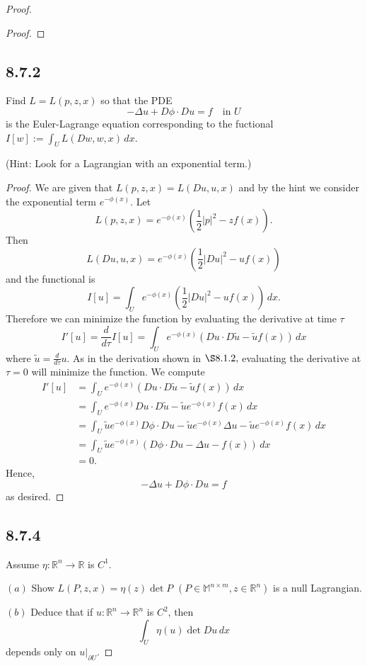 \documentclass{article}
\begin{document}
\begin{flushleft}
\begin{proof}
\begin{proof}
\end{proof}
\subsection{\textbf{8.7.2}} Find $L=L(p,z,x)$ so that the PDE
$$-\Delta u + D\phi \cdot Du=f \quad \text{in $U$}$$
is the Euler-Lagrange equation corresponding to the fuctional $I[w]:=\int_U L(Dw,w,x)\,dx$.

(Hint: Look for a Lagrangian with an exponential term.)
\begin{proof}
We are given that $L(p,z,x)=L(Du,u,x)$ and by the hint we consider the exponential term $e^{-\phi(x)}$. Let
$$L(p, z, x) = e^{-\phi(x)}\left(\frac 12|p|^2 - zf(x)\right).$$
Then
$$L(Du,u,x) = e^{-\phi(x)}\left(\frac 12|Du|^2 - uf(x)\right)$$
and the functional is
$$I[u]=\int_U e^{-\phi(x)}\left(\frac 12|Du|^2 - uf(x)\right)\,dx.$$
Therefore we can minimize the function by evaluating the derivative at time $\tau$
$$
I'[u]= \frac{d}{d\tau}I[u]=\int_U e^{-\phi(x)}\left(Du\cdot D{\tilde{u}} - \tilde{u}f(x)\right)\,dx $$
where $\tilde{u}=\frac{d}{d\tau}u$. As in the derivation shown in $\S 8.1.2, $ evaluating the derivative at $\tau=0$ will minimize the function. We compute
\begin{align*}
I'[u] &= \int_U e^{-\phi(x)}\left(Du\cdot D{\tilde{u}} - \tilde{u}f(x)\right)\,dx \\&=
\int_U e^{-\phi(x)} Du\cdot D{\tilde{u}} - \tilde{u}e^{-\phi(x)}f(x)\,dx\\&=
\int_U \tilde{u}e^{-\phi(x)}D\phi \cdot Du - \tilde{u}e^{-\phi(x)}\Delta u - \tilde{u}e^{-\phi(x)}f(x)\,dx \\&=
\int_U \tilde{u}e^{-\phi(x)}\left(D\phi \cdot Du - \Delta u - f(x)\right)\,dx\\&=0.
\end{align*}
Hence,
$$-\Delta u + D\phi \cdot Du=f$$
as desired.
\end{proof}
\subsection{\textbf{8.7.4}} Assume $\eta:\mathbb R^n \to \mathbb R$ is $C^1$.

$(a)$ Show $L(P,z,x)=\eta(z)\det P$ $(P\in \mathbb M^{n\times m}, z\in\mathbb R^n)$ is a null Lagrangian.

$(b)$ Deduce that if $u:\mathbb R^n \to \mathbb R^n$ is $C^2$, then
$$\int_U \eta(u)\det Du \,dx$$
depends only on $u|_{\partial U}$.


\end{proof}
\end{flushleft}
\end{document}
